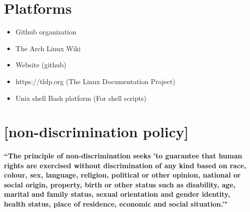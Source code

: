 \documentclass[a4paper, 11pt]{amsart}
\begin{document}
\section{Platforms}
\begin{itemize}
    \item Github organization
    \item The Arch Linux Wiki
    \item Website (github)
    \item https://tldp.org (The Linux Documentation Project)
    \item Unix shell Bash platform (For shell scripts)
\end{itemize}

\section{[non-discrimination policy]}
\paragraph{“The principle of non-discrimination seeks 'to guarantee that human rights are exercised without discrimination of any kind based on race, colour, sex, language, religion, political or other opinion, national or social origin, property, birth or other status such as disability, age, marital and family status, sexual orientation and gender identity, health status, place of residence, economic and social situation.'"}
\end{document}
